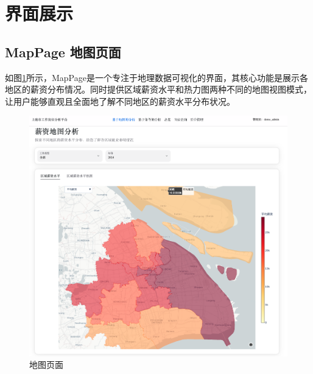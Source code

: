 \section{界面展示}

\subsection{MapPage 地图页面}
如图\ref{fig:map_page}所示，MapPage是一个专注于地理数据可视化的界面，其核心功能是展示各地区的薪资分布情况。同时提供区域薪资水平和热力图两种不同的地图视图模式，让用户能够直观且全面地了解不同地区的薪资水平分布状况。


\begin{figure}[htbp]
    \centering
    \includegraphics[width=1.0\textwidth]{figures/map_page.png}
    \caption{地图页面}
    \label{fig:map_page}
\end{figure}

